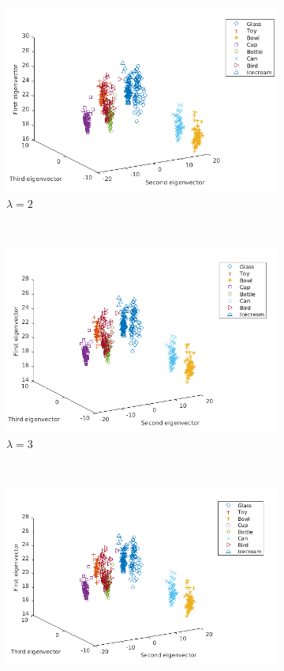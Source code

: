 \documentclass[10pt,a4paper]{article}
\begin{document}
\begin{figure}[H]
	\centering
	\begin{subfigure}[b]{0.5\textwidth}
		\includegraphics[width= \textwidth]{images/Laplace-lam2.png}
		\caption{$\lambda=2$}
		\label{}
	\end{subfigure}~
	\begin{subfigure}[b]{0.5\textwidth}
		\includegraphics[width= \textwidth]{images/Laplace-lam3.png}
		\caption{$\lambda=3$}
		\label{}
	\end{subfigure}\\
	\begin{subfigure}[b]{0.5\textwidth}
		\includegraphics[width= \textwidth]{images/Laplace-lam4.png}

\end{subfigure}
\end{figure}
\end{document}

